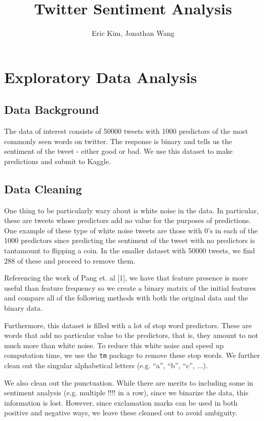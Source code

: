 \documentclass{article}
\title{Twitter Sentiment Analysis}
\author{Eric Kim, Jonathan Wang}
\date{}
\begin{document}
\maketitle

\section{Exploratory Data Analysis}

\subsection{Data Background}
The data of interest consists of 50000 tweets with 1000 predictors of the most commonly seen words on twitter. The response is binary and tells us the sentiment of the tweet - either good or bad. We use this dataset to make predictions and submit to Kaggle. %

\subsection{Data Cleaning}
One thing to be particularly wary about is white noise in the data. In particular, these are tweets whose predictors add no value for the purposes of predictions. One example of these type of white noise tweets are those with $0$'s in each of the 1000 predictors since predicting the sentiment of the tweet with no predictors is tantamount to flipping a coin. In the smaller dataset with 50000 tweets, we find 288 of these and proceed to remove them.

Referencing the work of Pang et. al [1], we have that feature presence is more useful than feature frequency so we create a binary matrix of the initial features and compare all of the following methods with both the original data and the binary data.

Furthermore, this dataset is filled with a lot of stop word predictors. These are words that add no particular value to the predictors, that is, they amount to not much more than white noise. To reduce this white noise and speed up computation time, we use the \texttt{tm} package to remove these stop words. We further clean out the singular alphabetical letters (e.g. ``a'', ``b'', ``c'', ...). 

We also clean out the punctuation. While there are merits to including some in sentiment analysis (e.g. multiple !!!! in a row), since we binarize the data, this information is lost. However, since exclamation marks can be used in both positive and negative ways, we leave these cleaned out to avoid ambiguity. %
\end{document}

